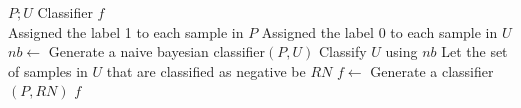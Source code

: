 \documentclass{article}
\begin{document}
\begin{algorithm}[!h]
\renewcommand{\algorithmicrequire}{\textbf{Input:}} %
\renewcommand{\algorithmicensure}{\textbf{Output:}} %
	\caption{NB-SVM} %
	\begin{algorithmic}[1] %
	    \REQUIRE
	    $P;U$
	    \ENSURE
	    Classifier $f$ \\
		\STATE Assigned the label 1 to each sample in $P$
		\STATE Assigned the label 0 to each sample in $U$
		\STATE $nb\leftarrow$ Generate a naive bayesian classifier$(P,U)$
		\STATE Classify $U$ using $nb$
		\STATE Let the set of samples in $U$ that are classified as negative be $RN$
        \STATE $f\leftarrow$ Generate a classifier$(P,RN)$
		\RETURN $f$
	\end{algorithmic}
\end{algorithm}
\end{document}
